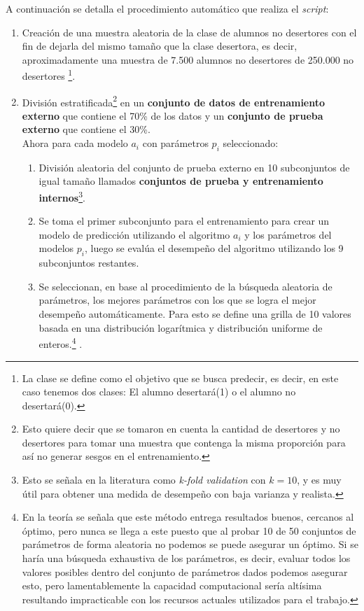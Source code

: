\begin{enumerate}
A continuación se detalla el procedimiento automático que realiza el \textit{script}:\\
\begin{enumerate}
\item Creación de una muestra aleatoria de la clase de alumnos no desertores con el fin de dejarla del mismo tamaño que la clase desertora, es decir, aproximadamente una muestra de 7.500 alumnos no desertores de 250.000 no desertores \footnote{La clase se define como el objetivo que se busca predecir, es decir, en este caso tenemos dos clases: El alumno desertará(1) o el alumno no desertará(0).}.
\item División estratificada\footnote{Esto quiere decir que se tomaron en cuenta la cantidad de desertores y no desertores para tomar una muestra que contenga la misma proporción para así no generar sesgos en el entrenamiento.} en un \textbf{conjunto de datos de entrenamiento externo} que contiene el 70\% de los datos y un \textbf{conjunto de prueba externo} que contiene el 30\%.
\\ \hfill
Ahora para cada modelo $a_i$ con parámetros $p_i$ seleccionado:
    \begin{enumerate}
    \item División aleatoria del conjunto de prueba externo en 10 subconjuntos de igual tamaño llamados \textbf{conjuntos de prueba y entrenamiento internos}\footnote{Esto se señala en la literatura como \textit{k-fold validation} con $k = 10$, y es muy útil para obtener una medida de desempeño con baja varianza y realista.}.
    \item Se toma el primer subconjunto para el entrenamiento para crear un modelo de predicción utilizando el algoritmo $a_i$ y los parámetros del modelos $p_i$, luego se evalúa el desempeño del algoritmo utilizando los 9 subconjuntos restantes.
    \item Se seleccionan, en base al procedimiento de la búsqueda aleatoria de parámetros, los mejores parámetros con los que se logra el mejor desempeño automáticamente. Para esto se define una grilla de 10 valores basada en una distribución logarítmica y distribución uniforme de enteros.\footnote{En la teoría se señala que este método entrega resultados buenos, cercanos al óptimo, pero nunca se llega a este puesto que al probar 10 de 50 conjuntos de parámetros de forma aleatoria no podemos se puede asegurar un óptimo. Si se haría una búsqueda exhaustiva de los parámetros, es decir, evaluar todos los valores posibles dentro del conjunto de parámetros dados podemos asegurar esto, pero lamentablemente la capacidad computacional sería altísima resultando impracticable con los recursos actuales utilizados para el trabajo.} .

\end{enumerate}
\end{enumerate}
\end{enumerate}
